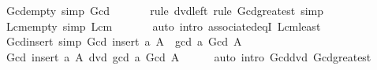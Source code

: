 \begin{isabellebody}
\endisatagproof
{\isafoldproof}%
%
\isadelimproof
\isanewline
%
\endisadelimproof
\isanewline
{}\isamarkupfalse%
\ Gcd{\isacharunderscore}{\kern0pt}empty\ {\isacharbrackleft}{\kern0pt}simp{\isacharbrackright}{\kern0pt}{\isacharcolon}{\kern0pt}\ {\isachardoublequoteopen}Gcd\ {\isacharbraceleft}{\kern0pt}{\isacharbraceright}{\kern0pt}\ {\isacharequal}{\kern0pt}\ {}{\isachardoublequoteclose}\isanewline
%
\isadelimproof
\ \ %
\endisadelimproof
%
\isatagproof
{}\isamarkupfalse%
\ {\isacharparenleft}{\kern0pt}rule\ dvd{\isacharunderscore}{\kern0pt}{}{\isacharunderscore}{\kern0pt}left{\isacharcomma}{\kern0pt}\ rule\ Gcd{\isacharunderscore}{\kern0pt}greatest{\isacharparenright}{\kern0pt}\ simp%
\endisatagproof
{\isafoldproof}%
%
\isadelimproof
\isanewline
%
\endisadelimproof
\isanewline
{}\isamarkupfalse%
\ Lcm{\isacharunderscore}{\kern0pt}empty\ {\isacharbrackleft}{\kern0pt}simp{\isacharbrackright}{\kern0pt}{\isacharcolon}{\kern0pt}\ {\isachardoublequoteopen}Lcm\ {\isacharbraceleft}{\kern0pt}{\isacharbraceright}{\kern0pt}\ {\isacharequal}{\kern0pt}\ {}{\isachardoublequoteclose}\isanewline
%
\isadelimproof
\ \ %
\endisadelimproof
%
\isatagproof
{}\isamarkupfalse%
\ {\isacharparenleft}{\kern0pt}auto\ intro{\isacharcolon}{\kern0pt}\ associated{\isacharunderscore}{\kern0pt}eqI\ Lcm{\isacharunderscore}{\kern0pt}least{\isacharparenright}{\kern0pt}%
\endisatagproof
{\isafoldproof}%
%
\isadelimproof
\isanewline
%
\endisadelimproof
\isanewline
{}\isamarkupfalse%
\ Gcd{\isacharunderscore}{\kern0pt}insert\ {\isacharbrackleft}{\kern0pt}simp{\isacharbrackright}{\kern0pt}{\isacharcolon}{\kern0pt}\ {\isachardoublequoteopen}Gcd\ {\isacharparenleft}{\kern0pt}insert\ a\ A{\isacharparenright}{\kern0pt}\ {\isacharequal}{\kern0pt}\ gcd\ a\ {\isacharparenleft}{\kern0pt}Gcd\ A{\isacharparenright}{\kern0pt}{\isachardoublequoteclose}\isanewline
%
\isadelimproof
%
\endisadelimproof
%
\isatagproof
{}\isamarkupfalse%
\ {\isacharminus}{\kern0pt}\isanewline
\ \ \isamarkupfalse%
\ {\isachardoublequoteopen}Gcd\ {\isacharparenleft}{\kern0pt}insert\ a\ A{\isacharparenright}{\kern0pt}\ dvd\ gcd\ a\ {\isacharparenleft}{\kern0pt}Gcd\ A{\isacharparenright}{\kern0pt}{\isachardoublequoteclose}\isanewline
\ \ \ \ \isamarkupfalse%
\ {\isacharparenleft}{\kern0pt}auto\ intro{\isacharcolon}{\kern0pt}\ Gcd{\isacharunderscore}{\kern0pt}dvd\ Gcd{\isacharunderscore}{\kern0pt}greatest{\isacharparenright}{\kern0pt}\isanewline
\ \ \isamarkupfalse%

\end{isabellebody}
